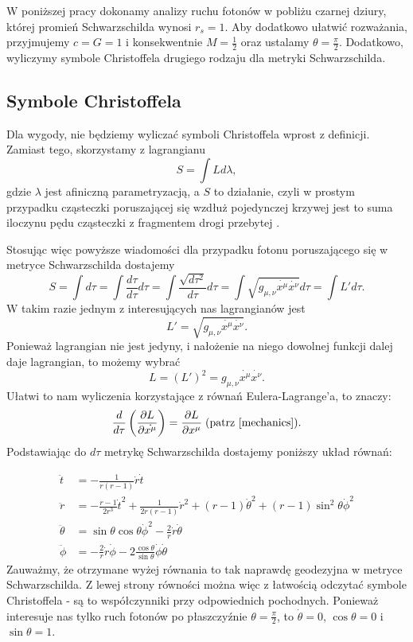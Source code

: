 W poniższej pracy dokonamy analizy ruchu fotonów w pobliżu czarnej dziury, której promień Schwarzschilda wynosi $r_s=1$. Aby dodatkowo ułatwić rozważania, przyjmujemy $c=G=1$ i konsekwentnie $M=\frac{1}{2}$ oraz ustalamy $\theta=\frac{\pi}{2}$. Dodatkowo, wyliczymy symbole Christoffela drugiego rodzaju dla metryki Schwarzschilda.

\subsection{Symbole Christoffela}

Dla wygody, nie będziemy wyliczać symboli Christoffela wprost z definicji. Zamiast tego, skorzystamy z lagrangianu
$$ S = \int L d \lambda, $$
gdzie $\lambda$ jest afiniczną parametryzacją, a $S$ to działanie, czyli w prostym przypadku cząsteczki poruszającej się wzdłuż pojedynczej krzywej jest to suma iloczynu pędu cząsteczki z fragmentem drogi przebytej \cite{mechanics}. 

Stosując więc powyższe wiadomości dla przypadku fotonu poruszającego się w metryce Schwarzschilda dostajemy
$$ S = \int d \tau= \int \frac{d \tau}{d \tau} d \tau = \int \frac{\sqrt{d \tau^2}}{d \tau} d \tau = \int \sqrt{g_{\mu, \nu}\dot{x^\mu} \dot{x^\nu}}d \tau = \int L' d \tau. $$
W takim razie jednym z interesujących nas lagrangianów jest 
$$L'=\sqrt{g_{\mu, \nu}\dot{x^\mu}\dot{x^\nu}}.$$ 
Ponieważ lagrangian nie jest jedyny, i nałożenie na niego dowolnej funkcji dalej daje lagrangian, to możemy wybrać
$$L=(L')^2 = g_{\mu,\nu}\dot{x^\mu}\dot{x^\nu}.$$
Ułatwi to nam wyliczenia korzystające z równań Eulera-Lagrange'a, to znaczy:
$$\frac{d}{ d \tau}\left(\frac{\partial L}{\partial \dot{x^\mu}}\right)= \frac{\partial L}{\partial x^\mu}\; (\text{patrz \cite{mechanics}}). $$
Podstawiając do $d \tau$ metrykę Schwarzschilda dostajemy poniższy układ równań:

\begin{align*}
  \ddot{t}&=-\frac{1}{r(r-1)}\dot{r}\dot{t}\\
  \ddot{r}&=-\frac{r-1}{ 2r^3} \dot{t}^2+\frac{1}{2r(r-1)}\dot{r}^2+(r-1)\dot{\theta}^2+(r-1)\sin^2\theta \dot{\phi}^2\\
  \ddot{\theta} &= \sin \theta \cos \theta \dot{\phi}^2 - \frac{2}{ r} \dot{r}\dot{\theta}\\
  \ddot{\phi} &= -\frac{2}{r} \dot{r}\dot{\phi} - 2 \frac{\cos \theta}{ \sin \theta} \dot{\phi}  \dot{\theta} 
\end{align*}
Zauważmy, że otrzymane wyżej równania to tak naprawdę geodezyjna w metryce Schwarzschilda. Z lewej strony równości można więc z łatwością odczytać symbole Christoffela - są to współczynniki przy odpowiednich pochodnych. Ponieważ interesuje nas tylko ruch fotonów po płaszczyźnie $\theta=\frac{\pi}{2}$, to $\dot{\theta}=0$, $\cos \theta=0$ i $\sin \theta=1$.

